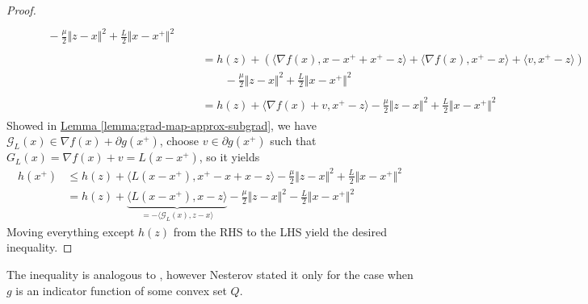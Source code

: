 \documentclass[12pt]{article}
\begin{document}
\begin{proof}
\begin{align*}
\begin{aligned}
                \\ 
                &\qquad 
                - \frac{\mu}{2}\Vert z - x\Vert^2
                + \frac{L}{2}\Vert x - x^+\Vert^2
            \end{aligned}
            \\& 
            \begin{aligned}
                &= h(z) + 
                \left(
                    \langle \nabla f(x), x - x^+ + x^+ - z\rangle + 
                    \langle \nabla f(x), x^+ - x\rangle + 
                    \langle v, x^+ - z\rangle
                \right)
                \\
                &\qquad 
                - \frac{\mu}{2}\Vert z - x\Vert^2
                + \frac{L}{2}\Vert x - x^+\Vert^2
            \end{aligned}
            \\& 
            \begin{aligned}
                &= h(z) + 
                \langle \nabla f(x) + v, x^+ - z\rangle 
                - \frac{\mu}{2}\Vert z - x\Vert^2
                + \frac{L}{2}\Vert x - x^+\Vert^2
            \end{aligned}
        \end{align*}
        Showed in  
        \hyperref[lemma:grad-map-approx-subgrad]{Lemma \ref*{lemma:grad-map-approx-subgrad}}, 
        we have $\mathcal G_L(x) \in \nabla f(x) + \partial g(x^+)$, choose $v \in \partial g(x^+)$ such that $G_L(x) = \nabla f(x) + v = L(x - x^+)$, so it yields
        \begin{align*}
            h(x^+) & 
            \le  
            h(z) + \langle L(x - x^+), x^+ - x + x - z\rangle 
            - \frac{\mu}{2}\Vert z - x\Vert^2
            + \frac{L}{2}\Vert x - x^+\Vert^2
            \\
            &= h(z) + 
            \underbrace{\langle L(x - x^+), x - z\rangle}_{
                = - \langle \mathcal G_L (x), z - x\rangle
            }
            - \frac{\mu}{2}\Vert z - x\Vert^2
            - \frac{L}{2}\Vert x - x^+\Vert^2
        \end{align*}
        Moving everything except $h(z)$ from the RHS to the LHS yield the desired inequality. 
    \end{proof}
    \begin{remark}
        The inequality is analogous to \cite[(2.2.57)]{nesterov_lectures_2018}, however Nesterov stated it only for the case when $g$ is an indicator function of some convex set $Q$. 
    \end{remark}
\end{document}
